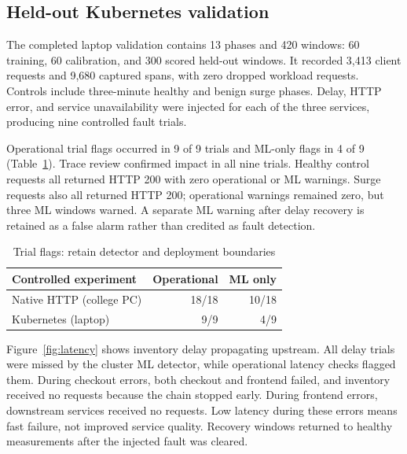 \documentclass[conference]{IEEEtran}
\begin{document}
\subsection{Held-out Kubernetes validation}
The completed laptop validation contains 13 phases and 420 windows: 60 training, 60 calibration, and 300 scored held-out windows. It recorded 3,413 client requests and 9,680 captured spans, with zero dropped workload requests. Controls include three-minute healthy and benign surge phases. Delay, HTTP error, and service unavailability were injected for each of the three services, producing nine controlled fault trials.

Operational trial flags occurred in 9 of 9 trials and ML-only flags in 4 of 9 (Table~\ref{tab:trials}). Trace review confirmed impact in all nine trials. Healthy control requests all returned HTTP 200 with zero operational or ML warnings. Surge requests also all returned HTTP 200; operational warnings remained zero, but three ML windows warned. A separate ML warning after delay recovery is retained as a false alarm rather than credited as fault detection.

\begin{table}[t]\centering
\caption{Trial flags: retain detector and deployment boundaries}\label{tab:trials}
\begin{tabular}{lrr}\toprule
Controlled experiment & Operational & ML only\\\midrule
Native HTTP (college PC) & 18/18 & 10/18\\
Kubernetes (laptop) & 9/9 & 4/9\\\bottomrule
\end{tabular}
\end{table}

Figure~\ref{fig:latency} shows inventory delay propagating upstream. All delay trials were missed by the cluster ML detector, while operational latency checks flagged them. During checkout errors, both checkout and frontend failed, and inventory received no requests because the chain stopped early. During frontend errors, downstream services received no requests. Low latency during these errors means fast failure, not improved service quality. Recovery windows returned to healthy measurements after the injected fault was cleared.
\end{document}

